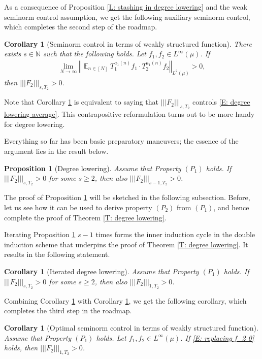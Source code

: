 \documentclass[11pt]{amsart}
\newtheorem{corollary}[lemma]{Corollary}
\newtheorem{proposition}[lemma]{Proposition}
\theoremstyle{definition}
\DeclareMathOperator*{\E}{\mathbb{E}}
\newcommand{\N}{{\mathbb N}}
\newcommand{\norm}[1]{\left\Vert #1\right\Vert}
\newcommand{\nnorm}[1]{\lvert\!|\!| #1|\!|\!\rvert}
\newcommand{\1}{{\mathbf{1}}}
\begin{document}
As a consequence of Proposition \ref{L: stashing in degree lowering} and the weak seminorm control assumption, we get the following auxiliary seminorm control, which completes the second step of the roadmap. 
\begin{corollary}[Seminorm control in terms of weakly structured function]\label{C: seminorm control by structured}
    There exists $s\in\N$ such that the following holds. Let $f_1, f_2\in L^\infty(\mu)$. If 
    \begin{align}\label{E: replacing f_2 0}
        \lim_{N\to\infty}\norm{\E_{n\in[N]}T_1^{a_1(n)}f_1 \cdot T_2^{a_1(n)}f_2}_{L^2(\mu)}>0,
    \end{align}
     then $\nnorm{F_2}_{s, T_{2}}>0$.
\end{corollary}
Note that Corollary \ref{C: seminorm control by structured} is equivalent to saying that $\nnorm{F_2}_{s, T_{2}}$ controls \eqref{E: degree lowering average}.
This contrapositive reformulation turns out to be more handy for degree lowering.

Everything so far has been basic preparatory maneuvers; the essence of the argument lies in the result below.
\begin{proposition}[Degree lowering]\label{P: degree lowering}
    Assume that Property $(P_1)$ holds. If $\nnorm{F_2}_{s, T_{2}}>0$ for some $s\geq 2$, then also $\nnorm{F_2}_{s-1, T_{2}}>0$. 
\end{proposition}
The proof of Proposition \ref{P: degree lowering} will be sketched in the following subsection. Before, let us see how it can be used to derive property $(P_{2})$ from $(P_1)$, and hence complete the proof of Theorem \ref{T: degree lowering}.

Iterating Proposition \ref{P: degree lowering} $s-1$ times forms the inner induction cycle in the double induction scheme that underpins the proof of Theorem \ref{T: degree lowering}. It results in the following statement. 
\begin{corollary}[Iterated degree lowering]\label{C: iterated degree lowering}
    Assume that Property $(P_1)$ holds. If $\nnorm{F_2}_{s, T_{2}}>0$ for some $s\geq 2$, then also $\nnorm{F_2}_{1, T_{2}}>0$. 
\end{corollary}
Combining Corollary \ref{C: iterated degree lowering} with Corollary \ref{C: seminorm control by structured}, we get the following corollary, which completes the third step in the roadmap.
\begin{corollary}[Optimal seminorm control in terms of weakly structured function]\label{C: optimal control by dual}
Assume that Property $(P_1)$ holds. Let $f_1, f_2\in L^\infty(\mu)$. %
If \eqref{E: replacing f_2 0} holds, then $\nnorm{F_2}_{1, T_{2}}>0$.
\end{corollary}
\end{document}
